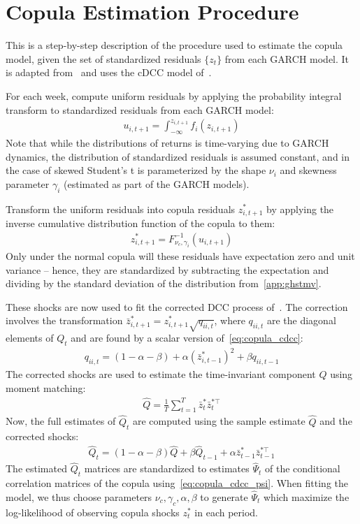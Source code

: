 
\section{Copula Estimation Procedure} %
\label{app:copula_cdcc}

This is a step-by-step description of the procedure used to estimate the copula model, given the set of standardized residuals $\{z_{t}\}$ from each GARCH model. It is adapted from~\textcite{ChristoffersenErrunzaJacobLanglois2012} and uses the cDCC model of~\textcite{Aielli2013}.

For each week, compute uniform residuals by applying the probability integral transform to standardized residuals from each GARCH model:
\begin{align}
  u_{i, t+1} = \int_{-\infty}^{z_{i,t+1}} f_{i}(z_{i,t+1})
\end{align}
Note that while the distributions of returns is time-varying due to GARCH dynamics, the distribution of standardized residuals is assumed constant, and in the case of skewed Student's t is parameterized by the shape $\nu_i$ and skewness parameter $\gamma_i$ (estimated as part of the GARCH models).

Transform the uniform residuals into copula residuals $z_{i,t+1}^*$ by applying the inverse cumulative distribution function of the copula to them:
\begin{align}
  z_{i,t+1}^* = F_{\nu_c,\gamma_i}^{-1}(u_{i,t+1})
\end{align}
Only under the normal copula will these residuals have expectation zero and unit variance -- hence, they are standardized by subtracting the expectation and dividing by the standard deviation of the distribution from~\autoref{app:ghstmv}.

These shocks are now used to fit the corrected DCC process of~\textcite{Aielli2013}. The correction involves the transformation $\bar{z}_{i,t+1}^* = z_{i,t+1}^* \sqrt{q_{ii,t}}$, where $q_{ii,t}$ are the diagonal elements of $Q_t$ and are found by a scalar version of~\autoref{eq:copula_cdcc}:
\begin{align}
  q_{ii,t} = (1 - \alpha - \beta)
    + \alpha (\bar{z}_{i,t-1}^*)^2
    + \beta q_{ii,t-1}
\end{align}
The corrected shocks are used to estimate the time-invariant component $Q$ using moment matching:
\begin{align}
  \hat{Q} = \frac{1}{T} \sum_{t=1}^T \bar{z}_{t}^* \bar{z}_t^{*\top}
\end{align}
Now, the full estimates of $\hat{Q}_t$ are computed using the sample estimate $\hat{Q}$ and the corrected shocks:
\begin{align}
  \hat{Q}_t = (1 - \alpha - \beta) \hat{Q}
    + \beta \hat{Q}_{t-1}
    + \alpha \bar{z}_{t-1}^* \bar{z}_{t-1}^{*\top}
\end{align}
The estimated $\hat{Q}_t$ matrices are standardized to estimates $\hat{\Psi}_t$ of the conditional correlation matrices of the copula using~\autoref{eq:copula_cdcc_psi}. When fitting the model, we thus choose parameters $\nu_c, \gamma_c, \alpha, \beta$ to generate $\hat{\Psi}_t$ which maximize the log-likelihood of observing copula shocks $z_t^*$ in each period.

